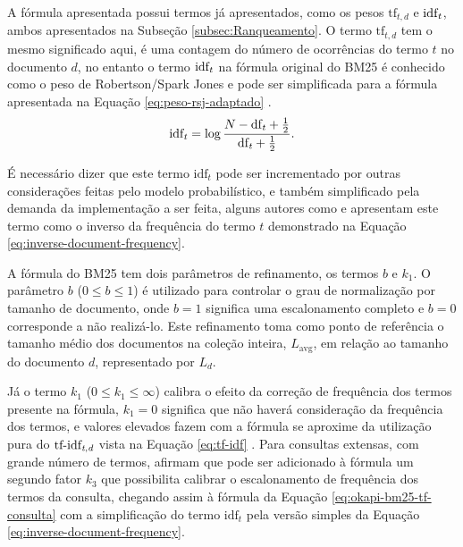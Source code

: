     A fórmula apresentada possui termos já apresentados, como os pesos $\text{tf}_{t,d}$ e $\text{idf}_{\text{\textit{t}}}$, ambos apresentados na Subseção \ref{subsec:Ranqueamento}.
    O termo $\text{tf}_{t,d}$ tem o mesmo significado aqui, é uma contagem do número de ocorrências do termo $t$ no documento $d$, no entanto o termo $\text{idf}_{\text{\textit{t}}}$ na fórmula original do BM25 é conhecido como o peso de Robertson/Spark Jones e pode ser simplificada para a fórmula apresentada na Equação \ref{eq:peso-rsj-adaptado} \cite[p.~347--349]{robertson_probabilistic_2010}.
    \begin{equation}
        \label{eq:peso-rsj-adaptado}
		\text{idf}_{\text{\textit{t}}} = \log{\frac{N-\text{df}_{\text{\textit{t}}}+\frac{1}{2}}{\text{df}_{\text{\textit{t}}} + \frac{1}{2} }}.
    \end{equation}
    
    É necessário dizer que este termo $\text{idf}_{t}$ pode ser incrementado por outras considerações feitas pelo modelo probabilístico, e também simplificado pela demanda da implementação a ser feita, alguns autores como  e  apresentam este termo como o inverso da frequência do termo $t$ demonstrado na Equação \ref{eq:inverse-document-frequency}.
    
    A fórmula do BM25 tem dois parâmetros de refinamento, os termos $b$ e $k_1$. 
    O parâmetro $b$ ($0 \leq b \leq 1$) é utilizado para controlar o grau de normalização por tamanho de documento, onde $b=1$ significa uma escalonamento completo e $b=0$ corresponde a não realizá-lo. 
    Este refinamento toma como ponto de referência o tamanho médio dos documentos na coleção inteira, $L_{\text{avg}}$, em relação ao tamanho do documento $d$, representado por $L_d$.
    
    Já o termo $k_1$ ($0 \leq k_1 \leq \infty$) calibra o efeito da correção de frequência dos termos presente na fórmula, $k_1=0$ significa que não haverá consideração da frequência dos termos, e valores elevados fazem com a fórmula se aproxime da utilização pura do $\text{tf-idf}_{\text{\textit{t},\textit{d}}}$ vista na Equação \ref{eq:tf-idf} \cite[p.~214]{Manning2008IIR}.
    Para consultas extensas, com grande número de termos,  afirmam que pode ser adicionado à fórmula um segundo fator $k_3$ que possibilita calibrar o escalonamento de frequência dos termos da consulta, chegando assim à fórmula da Equação \ref{eq:okapi-bm25-tf-consulta} com a simplificação do termo $\text{idf}_{t}$ pela versão simples da Equação \ref{eq:inverse-document-frequency}.
    
